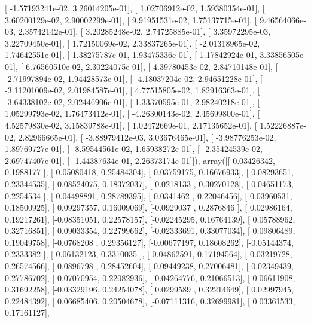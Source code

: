 \documentclass{article}
\begin{document}
       [ -1.57193241e-02,   3.26014205e-01],
       [  1.02706912e-02,   1.59380354e-01],
       [  3.60200129e-02,   2.90002299e-01],
       [  9.91951531e-02,   1.75137715e-01],
       [  9.46564066e-03,   2.35742142e-01],
       [  3.20285248e-02,   2.74725885e-01],
       [  3.35972295e-03,   3.22709450e-01],
       [  1.72150069e-02,   2.33837265e-01],
       [ -2.01318965e-02,   1.74642551e-01],
       [  1.38275787e-01,   1.93475336e-01],
       [  1.17842924e-01,   3.33856505e-01],
       [  6.76560510e-02,   2.30224075e-01],
       [  4.39780453e-02,   2.84710148e-01],
       [ -2.71997894e-02,   1.94428573e-01],
       [ -4.18037204e-02,   2.94651228e-01],
       [ -3.11201009e-02,   2.01984587e-01],
       [  4.77515805e-02,   1.82916363e-01],
       [ -3.64338102e-02,   2.02446906e-01],
       [  1.33370595e-01,   2.98240218e-01],
       [  1.05299793e-02,   1.76473412e-01],
       [ -4.26300143e-02,   2.45699800e-01],
       [  4.52579830e-02,   3.15839788e-01],
       [  1.02472669e-01,   2.17135652e-01],
       [  1.52226887e-02,   2.82966665e-01],
       [ -3.88979412e-03,   3.03676465e-01],
       [ -3.98776253e-02,   1.89769727e-01],
       [ -8.59544561e-02,   1.65938272e-01],
       [ -2.35424539e-02,   2.69747407e-01],
       [ -1.44387634e-01,   2.26373174e-01]]), array([[-0.03426342,  0.1988177 ],
       [ 0.05080418,  0.25484304],
       [-0.03759175,  0.16676933],
       [-0.08293651,  0.23344535],
       [-0.08524075,  0.18372037],
       [ 0.0218133 ,  0.30270128],
       [ 0.04651173,  0.2254534 ],
       [ 0.04498891,  0.28789395],
       [-0.0341462 ,  0.22046456],
       [ 0.03960531,  0.18500925],
       [ 0.09297357,  0.16009069],
       [-0.0929037 ,  0.2876846 ],
       [ 0.02986164,  0.19217261],
       [-0.08351051,  0.22578157],
       [-0.02245295,  0.16764139],
       [ 0.05788962,  0.32716851],
       [ 0.09033354,  0.22799662],
       [-0.02333691,  0.33077034],
       [ 0.09806489,  0.19049758],
       [-0.0768208 ,  0.29356127],
       [-0.00677197,  0.18608262],
       [-0.05144374,  0.2333382 ],
       [ 0.06132123,  0.3310035 ],
       [-0.04862591,  0.17194564],
       [-0.03219728,  0.26574566],
       [-0.0896798 ,  0.28452604],
       [ 0.09449238,  0.27006481],
       [-0.02349439,  0.27786702],
       [ 0.07070954,  0.22082936],
       [ 0.04264776,  0.21066513],
       [ 0.06611908,  0.31692258],
       [-0.03329196,  0.24254078],
       [ 0.0299589 ,  0.32214649],
       [ 0.02997945,  0.22484392],
       [ 0.06685406,  0.20504678],
       [-0.07111316,  0.32699981],
       [ 0.03361533,  0.17161127],
\end{document}
